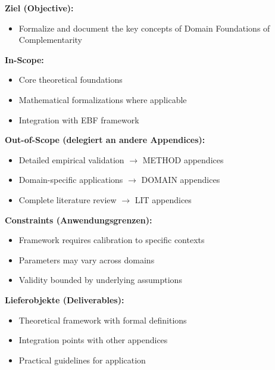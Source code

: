 
\begin{tcolorbox}[
    colback=orange!5!white,
    colframe=orange!75!black,
    title={\textbf{Appendix Scope: Ziel / In-Scope / Out-of-Scope / Constraints}},
    fonttitle=\bfseries
]

\textbf{Ziel (Objective):}
\begin{itemize}[nosep]
    \item Formalize and document the key concepts of Domain Foundations of Complementarity
\end{itemize}

\textbf{In-Scope:}
\begin{itemize}[nosep]
    \item Core theoretical foundations
    \item Mathematical formalizations where applicable
    \item Integration with EBF framework
\end{itemize}

\textbf{Out-of-Scope (delegiert an andere Appendices):}
\begin{itemize}[nosep]
    \item Detailed empirical validation $\rightarrow$ METHOD appendices
    \item Domain-specific applications $\rightarrow$ DOMAIN appendices
    \item Complete literature review $\rightarrow$ LIT appendices
\end{itemize}

\textbf{Constraints (Anwendungsgrenzen):}
\begin{itemize}[nosep]
    \item Framework requires calibration to specific contexts
    \item Parameters may vary across domains
    \item Validity bounded by underlying assumptions
\end{itemize}

\textbf{Lieferobjekte (Deliverables):}
\begin{itemize}[nosep]
    \item Theoretical framework with formal definitions
    \item Integration points with other appendices
    \item Practical guidelines for application
\end{itemize}

\end{tcolorbox}




